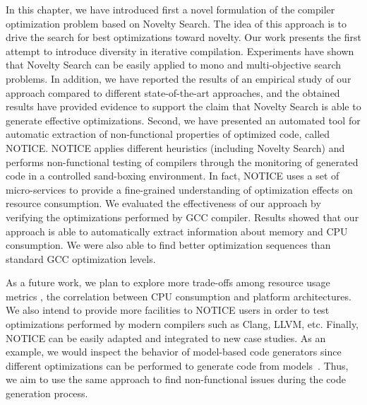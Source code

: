 In this chapter, we have introduced first a novel formulation of the compiler optimization problem based on Novelty Search. The idea of this approach is to drive the search for best optimizations toward novelty. Our work presents the first attempt to introduce diversity in iterative compilation. Experiments have shown that Novelty Search can be easily applied to mono and multi-objective search problems. In addition, we have reported the results of an empirical study of our approach compared to different state-of-the-art approaches, and the obtained results have provided evidence to support the claim that Novelty Search is able to generate effective optimizations.
Second, we have presented an automated tool for automatic extraction of non-functional properties of optimized code, called NOTICE. NOTICE applies different heuristics (including Novelty Search) and performs non-functional testing of compilers through the monitoring of generated code in a controlled sand-boxing environment. In fact, NOTICE uses a set of micro-services to provide a fine-grained understanding of optimization effects on resource consumption. 
We evaluated the effectiveness of our approach by verifying the optimizations performed by GCC compiler. 
Results showed that our approach is able to automatically extract information about memory and CPU consumption. We were also able to find better optimization sequences than standard GCC optimization levels.

As a future work, we plan to explore more trade-offs among resource usage metrics \eg, the correlation between CPU consumption and platform architectures. 
We also intend to provide more facilities to NOTICE users in order to test optimizations performed by modern compilers such as Clang, LLVM, etc.
Finally, NOTICE can be easily adapted and integrated to new case studies. As an example, we would inspect the behavior of model-based code generators since different optimizations can be performed to generate code from models~\cite{stuermer2007systematic}. Thus, we aim to use the same approach to find non-functional issues during the code generation process.



